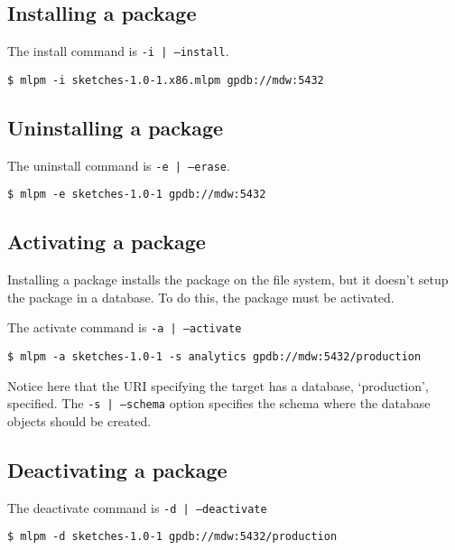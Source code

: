 \documentclass[11pt]{article}
\begin{document}
{	\subsection{Installing a package}

		The install command is \texttt{-i | --install}.

		\begin{lstlisting}
$ mlpm -i sketches-1.0-1.x86.mlpm gpdb://mdw:5432
		\end{lstlisting}

	\subsection{Uninstalling a package}

		The uninstall command is \texttt{-e | --erase}.

		\begin{lstlisting}
$ mlpm -e sketches-1.0-1 gpdb://mdw:5432
		\end{lstlisting}

	\subsection{Activating a package}

		Installing a package installs the package on the file system, but it
		doesn't setup the package in a database. To do this, the package must be
		activated.

		The activate command is \texttt{-a | --activate}

		\begin{lstlisting}
$ mlpm -a sketches-1.0-1 -s analytics gpdb://mdw:5432/production
		\end{lstlisting}

		Notice here that the URI specifying the target has a database,
		`production', specified. The \texttt{-s | --schema} option specifies the
		schema where the database objects should be created.

	\subsection{Deactivating a package}

		The deactivate command is \texttt{-d | --deactivate}

		\begin{lstlisting}
$ mlpm -d sketches-1.0-1 gpdb://mdw:5432/production
		\end{lstlisting}

}
\end{document}

